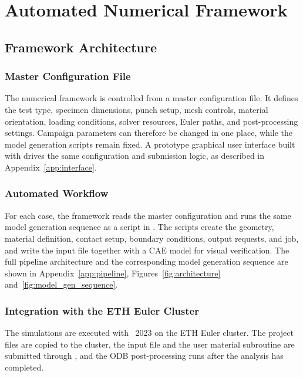 \chapter{Automated Numerical Framework}\label{chap:numerical_model}

\section{Framework Architecture}
\subsection{Master Configuration File}

The numerical framework is controlled from a master configuration file. It
defines the test type, specimen dimensions, punch setup, mesh controls, material
orientation, loading conditions, solver resources, Euler paths, and
post-processing settings. Campaign parameters can therefore be changed in one place,
while the model generation scripts remain fixed. A prototype graphical
user interface built with  drives the same configuration
and submission logic, as described in Appendix~\ref{app:interface}.

\subsection{Automated Workflow}

For each case, the framework reads the master configuration and runs the same
model generation sequence as a  script in .
The scripts create the geometry, material definition, contact setup, boundary
conditions, output requests, and  job, and write the input
file together with a CAE model for visual verification. The full pipeline
architecture and the corresponding model generation sequence are shown in
Appendix~\ref{app:pipeline}, Figures~\ref{fig:architecture}
and~\ref{fig:model_gen_sequence}.

\subsection{Integration with the ETH Euler Cluster}

The simulations are executed with ~2023 on the ETH
Euler cluster. The project files are copied to the cluster, the input file and
the user material subroutine are submitted through , and the
ODB post-processing runs after the analysis has completed.

